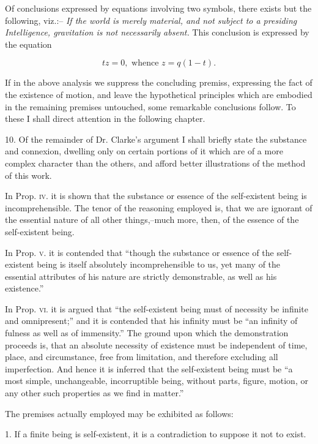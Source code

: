 \documentclass[oneside]{book}
\begin{document}
Of conclusions expressed by equations involving two symbols, there
exists but the following, viz.:-- \textit{If the world is merely material,
and not subject to a presiding Intelligence, gravitation is not
necessarily absent.} This conclusion is expressed by the equation

\[tz =0, \textrm{ whence } z = q (1 - t).\]

If in the above analysis we suppress the concluding premiss, expressing
the fact of the existence of motion, and leave the hypothetical
principles which are embodied in the remaining premises
untouched, some remarkable conclusions follow. To these I
shall direct attention in the following chapter.

10. Of the remainder of Dr. Clarke's argument I shall briefly
state the substance and connexion, dwelling only on certain
portions of it which are of a more complex character than the others,
and afford better illustrations of the method of this work.

In Prop. \textsc{iv}. it is shown that the substance or essence of the
self-existent being is incomprehensible. The tenor of the reasoning
employed is, that we are ignorant of the essential nature of
all other things,--much more, then, of the essence of the
self-existent being.

In Prop. \textsc{v}. it is contended that ``though the substance or
essence of the self-existent being is itself absolutely incomprehensible
to us, yet many of the essential attributes of his nature
are strictly demonstrable, as well as his existence.''

In Prop. \textsc{vi}. it is argued that ``the self-existent being must
of necessity be infinite and omnipresent;'' and it is contended
that his infinity must be ``an infinity of fulness as well as of
immensity.'' The ground upon which the demonstration proceeds
is, that an absolute necessity of existence must be independent
of time, place, and circumstance, free from limitation,
and therefore excluding all imperfection. And hence it is
inferred that the self-existent being must be ``a most simple,
unchangeable, incorruptible being, without parts, figure, motion,
or any other such properties as we find in matter.''

The premises actually employed may be exhibited as follows:

1. If a finite being is self-existent, it is a contradiction to
suppose it not to exist.
\end{document}
